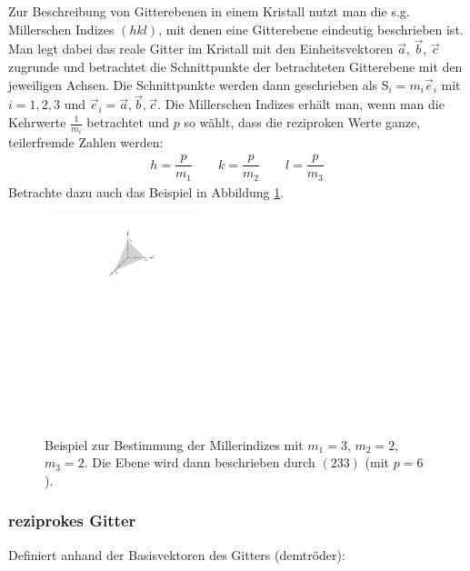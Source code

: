 \documentclass[10pt, a4paper]{article}
\begin{document}
Zur Beschreibung von Gitterebenen in einem Kristall nutzt man die s.g. Millerschen Indizes $(hkl)$, mit denen eine Gitterebene eindeutig beschrieben ist.
Man legt dabei das reale Gitter im Kristall mit den Einheitsvektoren $\vec{a}$, $\vec{b}$, $\vec{c}$ zugrunde und betrachtet die Schnittpunkte der betrachteten Gitterebene mit den jeweiligen Achsen.
Die Schnittpunkte werden dann geschrieben als S$_i=m_i\vec{e}_i$ mit $i=1,2,3$ und $\vec{e}_i= \vec{a}, \vec{b}, \vec{c}$.
Die Millerschen Indizes erhält man, wenn man die Kehrwerte $\frac{1}{m_i}$ betrachtet und $p$ so wählt, dass die reziproken Werte ganze, teilerfremde Zahlen werden\cite{demtroeder}:
\begin{align}
h=\dfrac{p}{m_1} \quad\quad k=\dfrac{p}{m_2} \quad\quad l=\dfrac{p}{m_3}
\end{align}
Betrachte dazu auch das Beispiel in Abbildung \ref{fig:millerindizes}.
\begin{figure}[h]
\centering
\includegraphics[width=0.4\textwidth]{./grafiken/millerindizes.pdf}
\caption{Beispiel zur Bestimmung der Millerindizes mit $m_1=3$, $m_2=2$, $m_3=2$. Die Ebene wird dann beschrieben durch $(233)$ (mit $p=6$).}
\label{fig:millerindizes}
\end{figure}

\subsubsection{reziprokes Gitter}
Definiert anhand der Basisvektoren des Gitters (demtröder):
\end{document}

